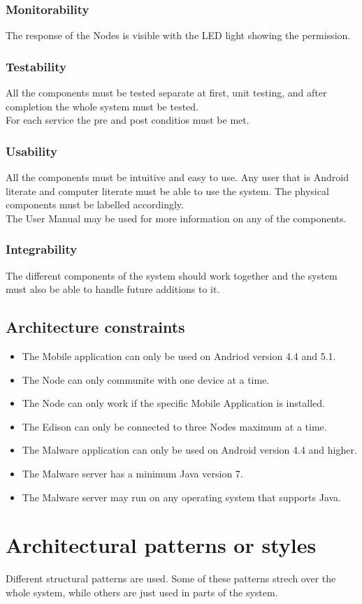 \documentclass[a4paper,12pt,titlepage]{article}
\begin{document}
\subsubsection{Monitorability}
The response of the Nodes is visible with the LED light showing the permission.

\subsubsection{Testability}
All the components must be tested separate at first, unit testing, and after completion the whole system must be tested.
\\ For each service the pre and post conditios must be met.

\subsubsection{Usability}
All the components must be intuitive and easy to use. Any user that is Android literate and computer literate must be able to use the system. The physical components must be labelled accordingly. 
\\ The User Manual may be used for more information on any of the components. 

\subsubsection{Integrability}
The different components of the system should work together and the system must also be able to handle future additions to it.\\

\subsection{Architecture constraints}
	\begin{itemize}
		\item The Mobile application can only be used on Andriod version 4.4 and 5.1.
		\item The Node can only communite with one device at a time.
		\item The Node can only work if the specific Mobile Application is installed.
		\item The Edison  can only be connected to three Nodes maximum at a time.
		\item The Malware application can only be used on Android version 4.4 and higher.
		\item The Malware server has a minimum Java version 7.
		\item The Malware server may run on any operating system that supports Java.

	\end{itemize}
\newpage	\section{Architectural patterns or styles}
Different structural patterns are used. Some of these patterns strech over the whole system, while others are just used in parts of the system.
\end{document}
